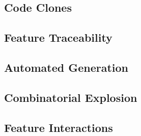 \subsection{Code Clones}

\subsection{Feature Traceability}

\subsection{Automated Generation}

\subsection{Combinatorial Explosion}

\subsection{Feature Interactions}


